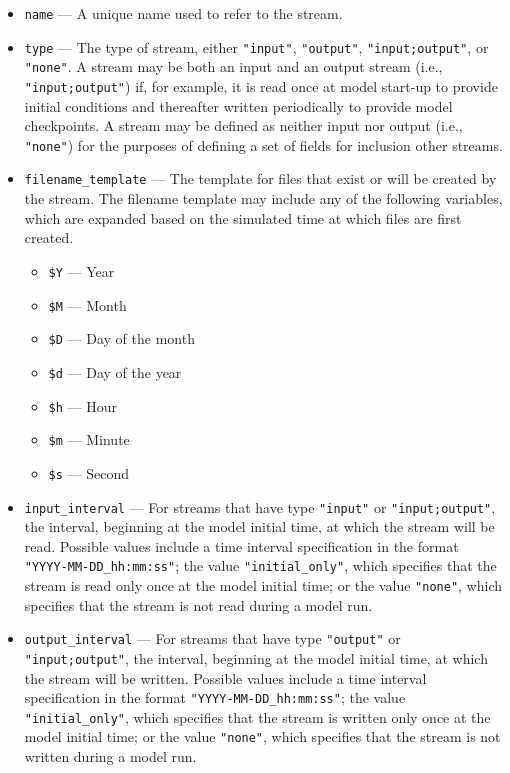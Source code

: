 \begin{itemize}
\item {\tt name} --- A unique name used to refer to the stream.
\item {\tt type} --- The type of stream, either {\tt "input"}, {\tt "output"}, {\tt "input;output"}, or {\tt "none"}. A stream may be both an input
and an output stream (i.e., {\tt "input;output"}) if, for example, it is read once at model start-up to provide initial conditions and thereafter written 
periodically to provide model checkpoints. A stream may be defined as neither input nor output (i.e., {\tt "none"}) for the purposes of defining a 
set of fields for inclusion other streams.
\item {\tt filename\_template} --- The template for files that exist or will be created by the stream. The filename template may include any of the
following variables, which are expanded based on the simulated time at which files are first created.
\begin{itemize}
\item {\tt \$Y} --- Year
\item {\tt \$M} --- Month
\item {\tt \$D} --- Day of the month
\item {\tt \$d} --- Day of the year
\item {\tt \$h} --- Hour
\item {\tt \$m} --- Minute
\item {\tt \$s} --- Second
\end{itemize}
\item {\tt input\_interval} --- For streams that have type {\tt "input"} or {\tt "input;output"}, the interval, beginning at the model initial time,
at which the stream will be read. Possible values include a time interval specification in the format {\tt "YYYY-MM-DD\_hh:mm:ss"}; the value 
{\tt "initial\_only"}, which specifies that the stream is read only once at the model initial time; or the value {\tt "none"}, which specifies that 
the stream is not read during a model run.
\item {\tt output\_interval} --- For streams that have type {\tt "output"} or {\tt "input;output"}, the interval, beginning at the model initial time,
at which the stream will be written. Possible values include a time interval specification in the format {\tt "YYYY-MM-DD\_hh:mm:ss"}; the value 
{\tt "initial\_only"}, which specifies that the stream is written only once at the model initial time; or the value {\tt "none"}, which specifies that 
the stream is not written during a model run.
\end{itemize}

